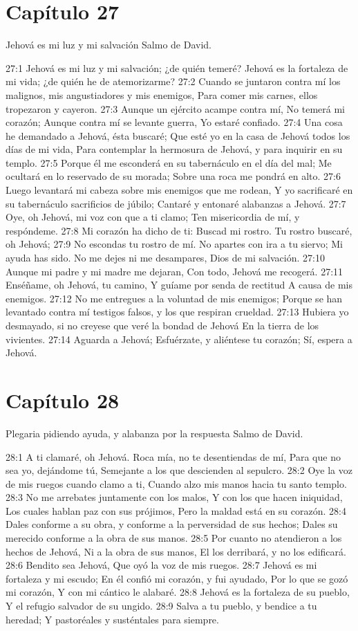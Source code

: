 \section*{Capítulo 27}
Jehová es mi luz y mi salvación 
Salmo de David. 

27:1 Jehová es mi luz y mi salvación; ¿de quién temeré? 
Jehová es la fortaleza de mi vida; ¿de quién he de atemorizarme? 
27:2 Cuando se juntaron contra mí los malignos, mis angustiadores y mis enemigos, 
Para comer mis carnes, ellos tropezaron y cayeron. 
27:3 Aunque un ejército acampe contra mí, 
No temerá mi corazón; 
Aunque contra mí se levante guerra, 
Yo estaré confiado. 
27:4 Una cosa he demandado a Jehová, ésta buscaré; 
Que esté yo en la casa de Jehová todos los días de mi vida, 
Para contemplar la hermosura de Jehová, y para inquirir en su templo. 
27:5 Porque él me esconderá en su tabernáculo en el día del mal; 
Me ocultará en lo reservado de su morada; 
Sobre una roca me pondrá en alto. 
27:6 Luego levantará mi cabeza sobre mis enemigos que me rodean, 
Y yo sacrificaré en su tabernáculo sacrificios de júbilo; 
Cantaré y entonaré alabanzas a Jehová. 
27:7 Oye, oh Jehová, mi voz con que a ti clamo; 
Ten misericordia de mí, y respóndeme. 
27:8 Mi corazón ha dicho de ti: Buscad mi rostro. 
Tu rostro buscaré, oh Jehová; 
27:9 No escondas tu rostro de mí. 
No apartes con ira a tu siervo; 
Mi ayuda has sido. 
No me dejes ni me desampares, Dios de mi salvación. 
27:10 Aunque mi padre y mi madre me dejaran, 
Con todo, Jehová me recogerá. 
27:11 Enséñame, oh Jehová, tu camino, 
Y guíame por senda de rectitud 
A causa de mis enemigos. 
27:12 No me entregues a la voluntad de mis enemigos; 
Porque se han levantado contra mí testigos falsos, y los que respiran crueldad. 
27:13 Hubiera yo desmayado, si no creyese que veré la bondad de Jehová 
En la tierra de los vivientes. 
27:14 Aguarda a Jehová; 
Esfuérzate, y aliéntese tu corazón; 
Sí, espera a Jehová. 
\section*{Capítulo 28}
Plegaria pidiendo ayuda, y alabanza por la respuesta 
Salmo de David. 

28:1 A ti clamaré, oh Jehová. 
Roca mía, no te desentiendas de mí, 
Para que no sea yo, dejándome tú, 
Semejante a los que descienden al sepulcro. 
28:2 Oye la voz de mis ruegos cuando clamo a ti, 
Cuando alzo mis manos hacia tu santo templo. 
28:3 No me arrebates juntamente con los malos, 
Y con los que hacen iniquidad, 
Los cuales hablan paz con sus prójimos, 
Pero la maldad está en su corazón. 
28:4 Dales conforme a su obra, y conforme a la perversidad de sus hechos; 
Dales su merecido conforme a la obra de sus manos. 
28:5 Por cuanto no atendieron a los hechos de Jehová, 
Ni a la obra de sus manos, 
El los derribará, y no los edificará. 
28:6 Bendito sea Jehová, 
Que oyó la voz de mis ruegos. 
28:7 Jehová es mi fortaleza y mi escudo; 
En él confió mi corazón, y fui ayudado, 
Por lo que se gozó mi corazón, 
Y con mi cántico le alabaré. 
28:8 Jehová es la fortaleza de su pueblo, 
Y el refugio salvador de su ungido. 
28:9 Salva a tu pueblo, y bendice a tu heredad; 
Y pastoréales y susténtales para siempre. 
